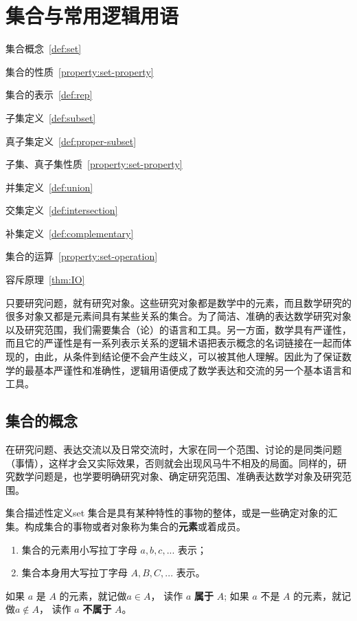 \chapter{集合与常用逻辑用语}
\label{ch:集合与常用逻辑用语}

\begin{introduction}
  \item 集合概念~\ref{def:set}
  \item 集合的性质~\ref{property:set-property}
  \item 集合的表示~\ref{def:rep}
  \item 子集定义~\ref{def:subset}
  \item 真子集定义~\ref{def:proper-subset}
  \item 子集、真子集性质~\ref{property:set-property}
  \item 并集定义~\ref{def:union}
  \item 交集定义~\ref{def:intersection}
  \item 补集定义~\ref{def:complementary}
  \item 集合的运算~\ref{property:set-operation}
  \item 容斥原理~\ref{thm:IO}
\end{introduction}

只要研究问题，就有研究对象。这些研究对象都是数学中的元素，而且数学研究的很多对象又都是元素间具有某些关系的集合。为了简洁、准确的表达数学研究对象以及研究范围，我们需要集合（论）的语言和工具。另一方面，数学具有严谨性，而且它的严谨性是有一系列表示关系的逻辑术语把表示概念的名词链接在一起而体现的，由此，从条件到结论便不会产生歧义，可以被其他人理解。因此为了保证数学的最基本严谨性和准确性，逻辑用语便成了数学表达和交流的另一个基本语言和工具。


\section{集合的概念}

在研究问题、表达交流以及日常交流时，大家在同一个范围、讨论的是同类问题（事情），这样才会又实际效果，否则就会出现风马牛不相及的局面。同样的，研究数学问题是，也学要明确研究对象、确定研究范围、准确表达数学对象及研究范围。

\begin{definition}{集合描述性定义}{set}
  集合是具有某种特性的事物的整体，或是一些确定对象的汇集。构成集合的事物或者对象称为集合的\textcolor{main}{\textbf{元素}}或着成员。 
  \begin{enumerate}
	  \item 集合的元素用小写拉丁字母 $a, b, c, ...$ 表示；
	  \item 集合本身用大写拉丁字母 $A, B, C, ...$ 表示。
  \end{enumerate}
  如果 $a$ 是 $A$ 的元素，就记做\underline{$a \in A$}， 读作 $a$ \textbf{属于} $A$; 如果 $a$ 不是 $A$ 的元素，就记做\underline{$a \notin A$}， 读作 $a$ \textbf{不属于} $A$。
\end{definition}

